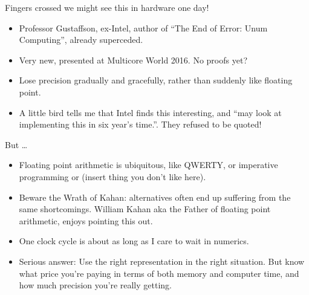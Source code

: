 \documentclass{beamer}
\begin{document}
\begin{frame}{Fingers crossed we might see this in hardware one day!}
\begin{itemize}
\item Professor Gustaffson, ex-Intel, author of ``The End of Error: Unum Computing'', already superceded.
\item Very new, presented at Multicore World 2016. No proofs yet?
\item Lose precision gradually and gracefully, rather than suddenly like floating point.
\item A little bird tells me that Intel finds this interesting, and ``may look at implementing this in
			six year's time.''. They refused to be quoted!
\end{itemize}
\end{frame}

\begin{frame}{But \ldots}
\begin{itemize}
\item Floating point arithmetic is ubiquitous, like QWERTY, or imperative programming or (insert thing
			you don't like here).
\item Beware the Wrath of Kahan: alternatives often end up suffering from the same shortcomings. 
			William Kahan aka the Father of floating point arithmetic, enjoys pointing this out.
\item One clock cycle is about as long as I care to wait in numerics.
\item Serious answer: Use the right representation in the right situation. But know what price you're paying 				in terms of both memory and computer time, and how much precision you're really getting.
\end{itemize}
\end{frame}

\end{document}
